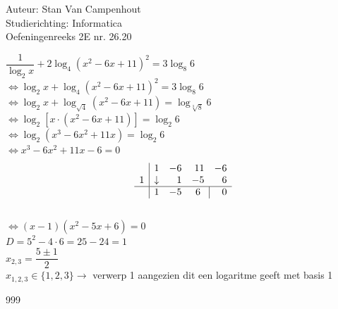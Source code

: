 \documentclass[a4paper]{article}
\begin{document}
  
\noindent \large Auteur: Stan Van Campenhout \\
\noindent \large Studierichting:  Informatica\\
\noindent \large Oefeningenreeks 2E nr. 26.20\\

\medskip

\normalsize

$ \dfrac{1}{\log_{2}x} + 2\log_{4}\left(x^2 - 6x + 11\right)^2 = 3\log_{8}6 $\\

$ \Leftrightarrow \log_{2}x + \log_{4}\left(x^2 - 6x + 11\right)^2 = 3\log_{8}6 $\\

$ \Leftrightarrow \log_{2}x + \log_{\sqrt4}\left(x^2 - 6x + 11\right) = \log_{\sqrt[3]8}6 $\\

$ \Leftrightarrow \log_{2}[x\cdot \left(x^2 - 6x + 11\right)] = \log_{2}6 $\\

$ \Leftrightarrow \log_{2} \left(x^3 - 6x^2 + 11x\right) = \log_{2}6 $\\

$ \Leftrightarrow x^3 - 6x^2 + 11x - 6 = 0 $\\

 \[ \begin{array}{c|rrrr}     
&1 &-6 &11 &-6  \\  
1 & \downarrow  &1 &-5 &6 \\ \hline
 &1 &-5 &  \multicolumn{1}{c|}{6}  &0
\end{array} \] \\

$ \Leftrightarrow \left(x - 1\right)\left(x^2 - 5x + 6\right) = 0 $\\

$ D = 5^2 - 4 \cdot 6 = 25 - 24 = 1 $\\

$ x_{2,3} = \dfrac{5 \pm 1}{2} $\\

$ x_{1,2,3} \in \{1,2,3\} \rightarrow $ verwerp 1 aangezien dit een logaritme geeft met basis 1 \\

\begin{thebibliography}{999}
\end{thebibliography}
\end{document}
